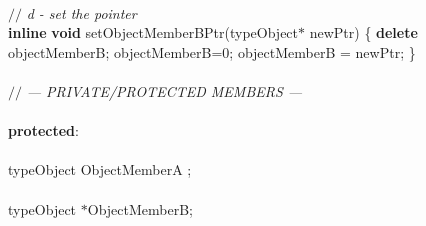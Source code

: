 \begin{flushleft}
\mbox{}\\
{$//$\it{} d - set the pointer {}\mbox{}\\
}{\bf inline} {\bf void} setObjectMemberBPtr(typeObject$\ast$ newPtr) \{ {\bf delete} objectMemberB; objectMemberB=0; objectMemberB = newPtr; \}\mbox{}\\
\hspace*{8\indentation}\mbox{}\\
{$//$\it{} --- PRIVATE/PROTECTED MEMBERS ---{}\mbox{}\\
}\mbox{}\\
{\bf protected}:\mbox{}\\
\mbox{}\\
typeObject ObjectMemberA ;\mbox{}\\
\mbox{}\\
typeObject $\ast$ObjectMemberB;\mbox{}\\
\mbox{}\\
\end{flushleft}
